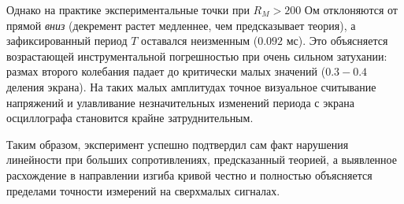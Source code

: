 \documentclass[a4paper,12pt]{article}
\begin{document}
\hspace{15pt} Однако на практике экспериментальные точки при $R_M > 200$ Ом отклоняются от прямой \textit{вниз} (декремент растет медленнее, чем предсказывает теория), а зафиксированный период $T$ оставался неизменным ($0.092$ мс). Это объясняется возрастающей инструментальной погрешностью при очень сильном затухании: размах второго колебания падает до критически малых значений ($0.3 - 0.4$ деления экрана). На таких малых амплитудах точное визуальное считывание напряжений и улавливание незначительных изменений периода с экрана осциллографа становится крайне затруднительным. 

\hspace{15pt} Таким образом, эксперимент успешно подтвердил сам факт нарушения линейности при больших сопротивлениях, предсказанный теорией, а выявленное расхождение в направлении изгиба кривой честно и полностью объясняется пределами точности измерений на сверхмалых сигналах.
\end{document}
